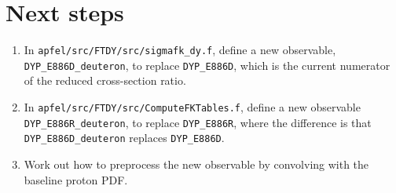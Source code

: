 \documentclass[a4paper,12pt]{article}
\begin{document}
\section{Next steps}
\begin{enumerate}
    \item In \texttt{apfel/src/FTDY/src/sigmafk\_dy.f}, define a new observable, \texttt{DYP\_E886D\_deuteron}, to replace \texttt{DYP\_E886D}, which is the current numerator of the reduced cross-section ratio.  
    \item In \texttt{apfel/src/FTDY/src/ComputeFKTables.f}, define a new observable \texttt{DYP\_E886R\_deuteron}, to replace \texttt{DYP\_E886R}, where the difference is that \texttt{DYP\_E886D\_deuteron} replaces \texttt{DYP\_E886D}.
    \item Work out how to preprocess the new observable by convolving with the baseline proton PDF.
\end{enumerate}
\end{document}
